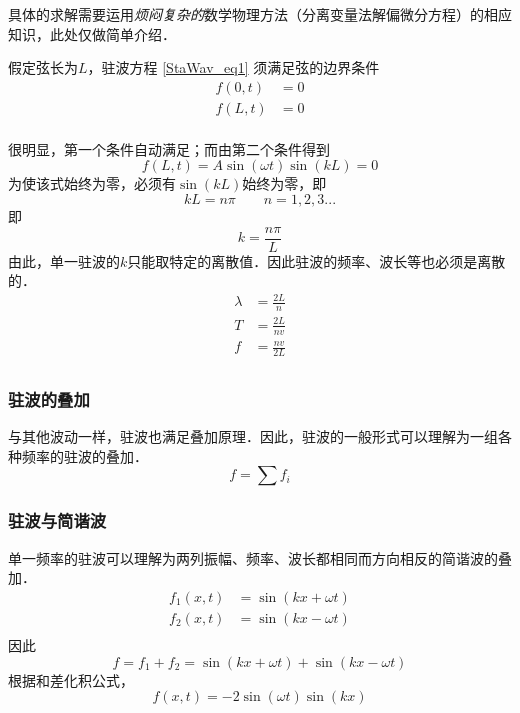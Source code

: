 具体的求解需要运用\textsl{烦闷复杂的}数学物理方法（分离变量法解偏微分方程）的相应知识，此处仅做简单介绍．

假定弦长为$L$，驻波方程 \autoref{StaWav_eq1} 须满足弦的边界条件 
$$
\begin{aligned}
f(0,t)&=0\\
f(L,t)&=0\\
\end{aligned}
$$

很明显，第一个条件自动满足；而由第二个条件得到
$$
f(L,t)=A\sin(\omega t)\sin(kL)=0
$$
为使该式始终为零，必须有$\sin(kL)$始终为零，即
$$kL = n\pi \qquad n=1,2,3...$$
即
\begin{equation}
k=\frac{n\pi}{L}
\end{equation}
由此，单一驻波的$k$只能取特定的离散值．因此驻波的频率、波长等也必须是离散的．
\begin{equation}
\begin{aligned}
\lambda &=\frac{2L}{n}\\
T &=\frac{2L}{nv}\\
f &=\frac{nv}{2L}\\
\end{aligned}
\end{equation}
\subsubsection{驻波的叠加}
与其他波动一样，驻波也满足叠加原理．因此，驻波的一般形式可以理解为一组各种频率的驻波的叠加．$$f=\sum f_i$$

\subsubsection{驻波与简谐波}
单一频率的驻波可以理解为两列振幅、频率、波长都相同而方向相反的简谐波的叠加．
$$
\begin{aligned}
f_1(x,t)&=\sin(kx+\omega t)\\
f_2(x,t)&=\sin(kx-\omega t)\\
\end{aligned}
$$
因此
$$f=f_1+f_2=\sin(kx+\omega t)+\sin(kx-\omega t)$$
根据和差化积公式，
\begin{equation}
f(x,t)=-2\sin(\omega t)\sin(kx)
\end{equation}

